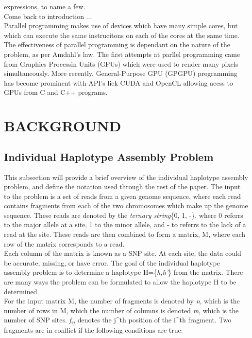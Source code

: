 \documentclass[10pt,twocolumn]{witseiepaper}
\begin{document}
expressions, to name a few. \\
Come back to introduction ... \\
Parallel programming makes use of devices which have many simple cores, but which can execute the same
instrucitons on each of the cores at the same time. The effectiveness of parallel programming is dependant on
the nature of the problem, as per Amdahl's law. The first attempts at parllel programming came from Graphics
Processin Units (GPUs) which were used to render many pixels simultaneously. More recently, General-Purpose
GPU (GPGPU) programming has become prominent with API's liek CUDA and OpenCL allowing accss to GPUs from C and
C++ programs. \\



\section{BACKGROUND}

\subsection{Individual Haplotype Assembly Problem}

This subsection will provide a brief overview of the individual haplotype assembly problem, and define the
notation used through the rest of the paper. The input to the problem is a set of reads from a given genome
sequence, where each read contains fragments from each of the two chromosomes which make up the genome
sequence. These reads are denoted by the \textit{ternary string}\{0, 1, -\}, where 0 referrs to the major allele
at a site, 1 to the minor allele, and - to referrs to the lack of a read at the site. These reads are then
combined to form a matrix, M, where each row of the matrix corresponds to a read. \\
Each column of the matrix is known as a SNP site. At each site, the data could be accurate, missing, or have
error. The goal of the individual haplotype assembly problem is to determine a haplotype H=\{\textit{h,h'}\}
from the matrix. There are many ways the problem can be formulated to allow the haplotype H to be determined.
\\
For the input matrix M, the number of fragments is denoted by \textit{n}, which is the number of rows in M,
which the number of columns is denoted \textit{m}, which is the number of SNP sites. \textit{f$_{ij}$} denotes
the j^{th} position of the i^{th} fragment. Two fragments are in conflict if the following conditions are
true:
\end{document}

